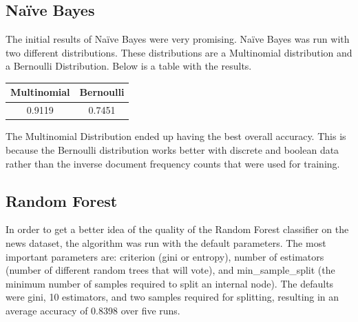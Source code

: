 \documentclass{article}
\begin{document}
        \subsection{Na\"ive Bayes}
        The initial results of Naïve Bayes were very promising. Naïve Bayes was run with two 
        different distributions. These distributions are a Multinomial distribution and a 
        Bernoulli Distribution. Below is a table with the results.
        \begin{center}
            \begin{tabular}{|cc|}
                \hline
                Multinomial & Bernoulli\\
                \hline
                0.9119      & 0.7451\\
                \hline
            \end{tabular}
        \end{center}
        The Multinomial Distribution ended up having the best overall accuracy. This is 
        because the Bernoulli distribution works better with discrete and boolean data rather 
        than the inverse document frequency counts that were used for training.
        \subsection{Random Forest}
        In order to get a better idea of the quality of the Random Forest classifier on the 
        news dataset, the algorithm was run with the default parameters. The most important 
        parameters are: criterion (gini or entropy), number of estimators (number of 
        different random trees that will vote), and min\_sample\_split (the minimum number of 
        samples required to split an internal node). The defaults were gini, 10 estimators, 
        and two samples required for splitting, resulting in an average accuracy of 0.8398 
        over five runs. 
\end{document}
